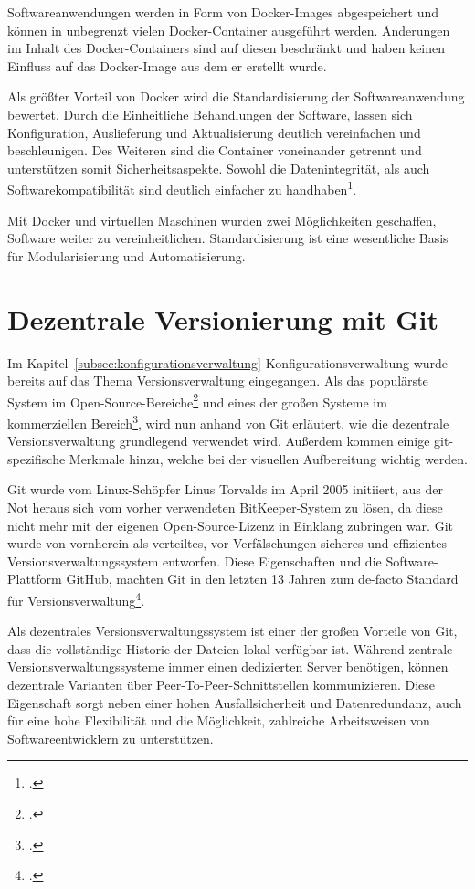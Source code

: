 Softwareanwendungen werden in Form von Docker-Images abgespeichert und können in unbegrenzt vielen Docker-Container ausgeführt werden. Änderungen im Inhalt des Docker-Containers sind auf diesen beschränkt und haben keinen Einfluss auf das Docker-Image aus dem er erstellt wurde.

Als größter Vorteil von Docker wird die Standardisierung der Softwareanwendung bewertet. Durch die Einheitliche Behandlungen der Software, lassen sich Konfiguration, Auslieferung und Aktualisierung deutlich vereinfachen und beschleunigen. Des Weiteren sind die Container voneinander getrennt und unterstützen somit Sicherheitsaspekte. Sowohl die Datenintegrität, als auch Softwarekompatibilität sind deutlich einfacher zu handhaben\footcite[vgl.][]{ten-benefits-docker}.

Mit Docker und virtuellen Maschinen wurden zwei Möglichkeiten geschaffen, Software weiter zu vereinheitlichen. Standardisierung ist eine wesentliche Basis für Modularisierung und Automatisierung.

\section{Dezentrale Versionierung mit Git}
\label{distributed-vcs-git}

Im Kapitel~\ref{subsec:konfigurationsverwaltung} Konfigurationsverwaltung wurde bereits auf das Thema Versionsverwaltung 
eingegangen. Als das populärste System im Open-Source-Bereiche\footcite[vgl.][]{openhub-pie-chart} und eines der großen Systeme 
im kommerziellen Bereich\footcite[vgl.][]{g2crowd2018}, wird nun anhand von Git erläutert, wie die dezentrale Versionsverwaltung 
grundlegend verwendet wird. Außerdem kommen einige git-spezifische Merkmale hinzu, welche bei der visuellen Aufbereitung 
wichtig werden.

Git wurde vom Linux-Schöpfer Linus Torvalds im April 2005 initiiert, aus der Not heraus sich vom vorher verwendeten \glqq BitKeeper\grqq{}-System zu lösen, da diese nicht mehr mit der eigenen Open-Source-Lizenz in Einklang zubringen war. Git wurde von vornherein als verteiltes, vor Verfälschungen sicheres und effizientes Versionsverwaltungssystem entworfen. 
Diese Eigenschaften und die Software-Plattform \glqq GitHub\grqq{}, machten Git in den letzten 13 Jahren zum de-facto Standard für Versionsverwaltung\footcite[vgl.][]{heise-torvald-git2015}.

Als dezentrales Versionsverwaltungssystem ist einer der großen Vorteile von Git, dass die vollständige Historie der Dateien lokal verfügbar ist. Während zentrale Versionsverwaltungssysteme immer einen dedizierten Server benötigen, können dezentrale Varianten über Peer-To-Peer-Schnittstellen kommunizieren. Diese Eigenschaft sorgt neben einer hohen Ausfallsicherheit und Datenredundanz, auch für eine hohe Flexibilität und die Möglichkeit, zahlreiche Arbeitsweisen von Softwareentwicklern zu unterstützen.

